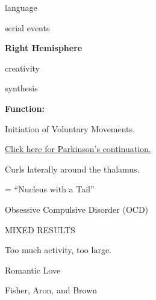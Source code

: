 \begin{coloredlist}
\begin{coloredlist}
\begin{coloredlist}
            \begin{coloredlist}
                \item language
                \item serial events
            \end{coloredlist}
            \item \textbf{Right Hemisphere}
            \begin{coloredlist}
                \item creativity
                \item synthesis
            \end{coloredlist}
        \end{coloredlist}
    \end{coloredlist}
    \item {}
    \begin{coloredlist}
        \item \textbf{Function:}
        \begin{coloredlist}
            \item Initiation of Voluntary Movements.
            \item \hyperlink{parkinson}{Click here for Parkinson's continuation.}
        \end{coloredlist}
        \item Curls laterally around the thalamus.
        \item {}
        \begin{coloredlist}
            \item {} = ``Nucleus with a Tail''
            \begin{coloredlist}
                \item Obsessive Compulsive Disorder (OCD)
                \begin{coloredlist}
                    \item MIXED RESULTS
                    \begin{coloredlist}
                        \item Too much activity, too large.
                    \end{coloredlist}
                \end{coloredlist}
                \item Romantic Love
                \begin{coloredlist}
                    \item Fisher, Aron, and Brown
                    \begin{coloredlist}

\end{coloredlist}
\end{coloredlist}
\end{coloredlist}
\end{coloredlist}
\end{coloredlist}
\end{coloredlist}
